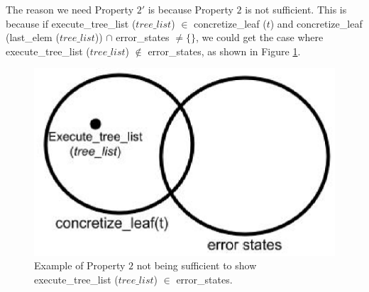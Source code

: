 The reason we need Property $2'$ is because Property $2$ is not sufficient. This is because if execute\_tree\_list ($tree\_list$) $\in$ concretize\_leaf ($t$) and concretize\_leaf (last\_elem ($tree\_list$)) $\cap$ error\_states $\neq \{\}$, we could get the case where
execute\_tree\_list ($tree\_list$) $\notin$ error\_states, as shown in Figure \ref{fig:Prop2}.

\begin{figure}
\label{fig:Prop2}
\includegraphics[width=\textwidth]{prop2.eps}
\caption{Example of Property $2$ not being sufficient to show execute\_tree\_list ($tree\_list$) $\in$ error\_states.}
\end{figure}




